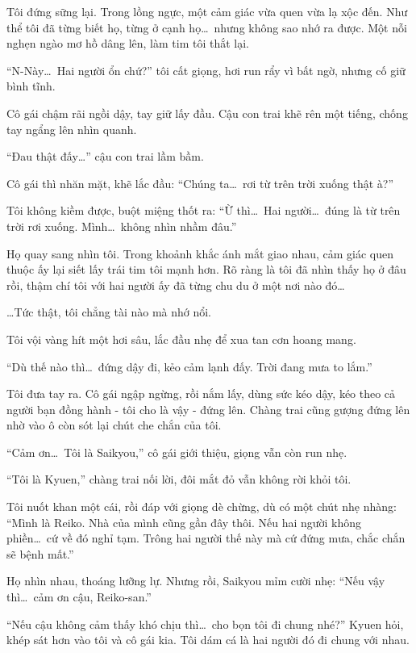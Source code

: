 \documentclass[../main.tex]{subfiles}
\begin{document}
Tôi đứng sững lại. Trong lồng ngực, một cảm giác vừa quen vừa lạ xộc đến. Như thể tôi đã từng biết họ, từng ở cạnh họ\dots\ nhưng không sao nhớ ra được. Một nỗi nghẹn ngào mơ hồ dâng lên, làm tim tôi thắt lại.

``N-Này\dots\ Hai người ổn chứ?'' tôi cất giọng, hơi run rẩy vì bất ngờ, nhưng cố giữ bình tĩnh.

Cô gái chậm rãi ngồi dậy, tay giữ lấy đầu. Cậu con trai khẽ rên một tiếng, chống tay ngẩng lên nhìn quanh.

``Đau thật đấy\dots'' cậu con trai lầm bầm.

Cô gái thì nhăn mặt, khẽ lắc đầu: ``Chúng ta\dots\ rơi từ trên trời xuống thật à?''

Tôi không kiềm được, buột miệng thốt ra: ``Ừ thì\dots\ Hai người\dots\ đúng là từ trên trời rơi xuống. Mình\dots\ không nhìn nhầm đâu.''

Họ quay sang nhìn tôi. Trong khoảnh khắc ánh mắt giao nhau, cảm giác quen thuộc ấy lại siết lấy trái tim tôi mạnh hơn. Rõ ràng là tôi đã nhìn thấy họ ở đâu rồi, thậm chí tôi với hai người ấy đã từng chu du ở một nơi nào đó\dots

\dots Tức thật, tôi chẳng tài nào mà nhớ nổi.

Tôi vội vàng hít một hơi sâu, lắc đầu nhẹ để xua tan cơn hoang mang.

``Dù thế nào thì\dots\ đứng dậy đi, kẻo cảm lạnh đấy. Trời đang mưa to lắm.''

Tôi đưa tay ra. Cô gái ngập ngừng, rồi nắm lấy, dùng sức kéo dậy, kéo theo cả người bạn đồng hành - tôi cho là vậy - đứng lên. Chàng trai cũng gượng đứng lên nhờ vào ô còn sót lại chút che chắn của tôi.

``Cảm ơn\dots\ Tôi là Saikyou,'' cô gái giới thiệu, giọng vẫn còn run nhẹ.

``Tôi là Kyuen,'' chàng trai nối lời, đôi mắt đỏ vẫn không rời khỏi tôi.

Tôi nuốt khan một cái, rồi đáp với giọng dè chừng, dù có một chút nhẹ nhàng: ``Mình là Reiko. Nhà của mình cũng gần đây thôi. Nếu hai người không phiền\dots\ cứ về đó nghỉ tạm. Trông hai người thế này mà cứ đứng mưa, chắc chắn sẽ bệnh mất.''

Họ nhìn nhau, thoáng lưỡng lự. Nhưng rồi, Saikyou mỉm cười nhẹ: ``Nếu vậy thì\dots\ cảm ơn cậu, Reiko-san.''

``Nếu cậu không cảm thấy khó chịu thì\dots\ cho bọn tôi đi chung nhé?'' Kyuen hỏi, khép sát hơn vào tôi và cô gái kia. Tôi dám cá là hai người đó đi chung với nhau.
\end{document}
